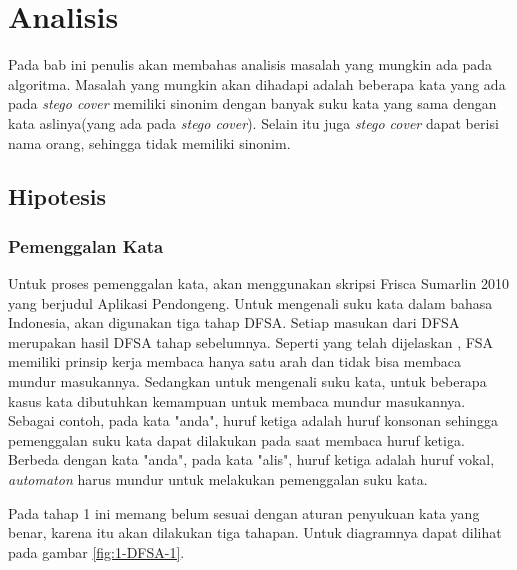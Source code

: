 \chapter{Analisis}
Pada bab ini penulis akan membahas analisis masalah yang mungkin ada pada algoritma. Masalah yang mungkin akan dihadapi adalah beberapa kata yang ada pada \textit{stego cover} memiliki sinonim dengan banyak suku kata yang sama dengan kata aslinya(yang ada pada \textit{stego cover}). Selain itu juga \textit{stego cover} dapat berisi nama orang, sehingga tidak memiliki sinonim.

\section{Hipotesis}

\subsection{Pemenggalan Kata}
Untuk proses pemenggalan kata, akan menggunakan skripsi Frisca Sumarlin 2010 yang berjudul Aplikasi Pendongeng. Untuk mengenali suku kata dalam bahasa Indonesia, akan digunakan tiga tahap DFSA. Setiap masukan dari DFSA merupakan hasil DFSA tahap sebelumnya. Seperti yang telah dijelaskan , FSA memiliki prinsip kerja membaca hanya satu arah dan tidak bisa membaca mundur masukannya. Sedangkan untuk mengenali suku kata, untuk beberapa kasus kata dibutuhkan kemampuan untuk membaca mundur masukannya. Sebagai contoh, pada kata "anda", huruf ketiga adalah huruf konsonan sehingga pemenggalan suku kata dapat dilakukan pada saat membaca huruf ketiga. Berbeda dengan kata "anda", pada kata "alis", huruf ketiga adalah huruf vokal, \textit{automaton} harus mundur untuk melakukan pemenggalan suku kata.

Pada tahap 1 ini memang belum sesuai dengan aturan penyukuan kata yang benar, karena itu akan dilakukan tiga tahapan. Untuk diagramnya dapat dilihat pada gambar \ref{fig:1-DFSA-1}.

